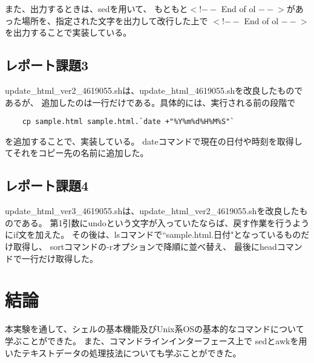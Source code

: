 \documentclass[12pt]{jarticle}
\begin{document}
また、出力するときは、sedを用いて、
もともと$<$!$--$ End of ol $--$$>$があった場所を、指定された文字を出力して改行した上で
        $<$!$--$ End of ol $--$$>$を出力することで実装している。

\subsection{レポート課題3}
update\_html\_ver2\_4619055.shは、update\_html\_4619055.shを改良したものであるが、
追加したのは一行だけである。具体的には、実行される前の段階で
\begin{lstlisting}
    cp sample.html sample.html.`date +"%Y%m%d%H%M%S"`
\end{lstlisting}
を追加することで、実装している。
dateコマンドで現在の日付や時刻を取得してそれをコピー先の名前に追加した。
\subsection{レポート課題4}
update\_html\_ver3\_4619055.shは、update\_html\_ver2\_4619055.shを改良したものである。
第1引数にundoという文字が入っていたならば、戻す作業を行うようにif文を加えた。
その後は、lsコマンドで``sample.html.日付"となっているものだけ取得し、
sortコマンドの-rオプションで降順に並べ替え、
最後にheadコマンドで一行だけ取得した。

\section{結論}
本実験を通して、シェルの基本機能及びUnix系OSの基本的なコマンドについて学ぶことができた。
また、コマンドラインインターフェース上で
sedとawkを用いたテキストデータの処理技法についても学ぶことができた。

\clearpage
\appendix
\end{document}
